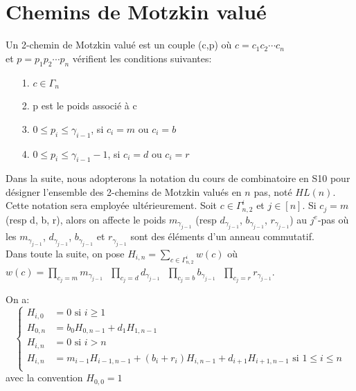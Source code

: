 \section{Chemins de Motzkin valué}
\begin{definition}
	\begin{rm}
		Un 2-chemin de Motzkin valué est un couple (c,p) où $c = c_{1}c_{2}\cdots c_{n}$\\ et $p = p_{1}p_{2}\cdots p_{n}$
		vérifient les conditions suivantes:
		\begin{itemize}
			\item[1.] $c \in \Gamma_{n}$
			\item[2.] p est le poids associé à c
			\item[3.] $0\leq p_{i}\leq \gamma_{i-1}$, si $c_{i}=m\text{ ou }c_{i}=b$
			\item[4.]  $0\leq p_{i}\leq \gamma_{i-1} - 1$, si  $c_{i}=d\text{ ou }c_{i}=r$
		\end{itemize}
	\end{rm}
\end{definition}
Dans la suite, nous adopterons la notation du cours de combinatoire en S10 pour désigner l'ensemble des 2-chemins de Motzkin valués en $n$ pas, noté $HL(n)$. Cette notation sera employée ultérieurement.
Soit $c \in \Gamma_{n, 2}^{i}$ et $j \in [n]$. Si $c_{j} = m$ (resp d, b, r), alors on affecte le poids $m_{\gamma_{j-1}}$ (resp
$d_{\gamma_{j-1}}$, $b_{\gamma_{j-1}}$, $r_{\gamma_{j-1}}$) au $j^e$-pas où les  $m_{\gamma_{j-1}}$, $d_{\gamma_{j-1}}$,
$b_{\gamma_{j-1}}$ et  $r_{\gamma_{j-1}}$ sont des éléments d'un anneau commutatif.\vspace{10pt}\\
Dans toute la suite, on pose $H_{i,n} = \underset{c\in \Gamma_{n,2}^{i}}{\sum}w(c)$ où $w(c) = \underset{c_{j}=m}{\prod}
	m_{\gamma_{j-1}}\text{ } \underset{c_{j}=d}{\prod}d_{\gamma_{j-1}}\text{ }\underset{c_{j}=b}{\prod}
	b_{\gamma_{j-1}}\text{ }\underset{c_{j}=r}{\prod}r_{\gamma_{j-1}}$.\\
\begin{proposition} \label{weight-tab}
	On a:
	\[
		\begin{cases}
			H_{i,0} & =0 \text{ si }i\geq 1                                                                  \\
			H_{0,n} & =b_{0}H_{0,n-1}+d_{1}H_{1,n-1}                                                         \\
			H_{i,n} & =0 \text{ si } i>n                                                                     \\
			H_{i,n} & =m_{i-1}H_{i-1,n-1}+(b_{i}+r_{i})H_{i,n-1}+d_{i+1}H_{i+1,n-1} \text{ si }1\leq i\leq n \\
		\end{cases}
	\]
	avec la convention $H_{0,0}=1$
\end{proposition}

